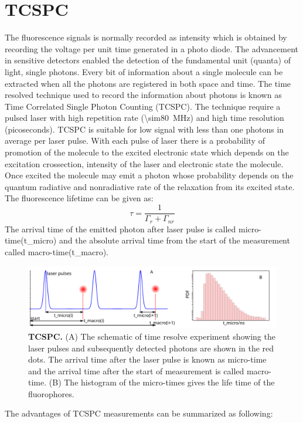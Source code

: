 \documentclass[11pt,a4paper,onecolumn]{article}
\begin{document}
\section{TCSPC}
The fluorescence signals is normally recorded as intensity which is obtained by recording the voltage per unit time generated in a photo diode.
The advancement in sensitive detectors enabled the detection of the fundamental unit (quanta) of light, single photons.
Every bit of information about a single molecule can be extracted when all the photons are registered in both space and time.
The time resolved technique used to record the information about photons is known as Time Correlated Single Photon Counting (TCSPC).
The technique require a pulsed laser with high repetition rate (\SI{\sim80}{\MHz}) and high time resolution (picoseconds).
TCSPC is suitable for low signal with less than one photons in average per laser pulse.
With each pulse of laser there is a probability of promotion of the molecule to the excited electronic state which depends on the excitation crossection, intensity of the laser and electronic state the molecule.
Once excited the molecule may emit a photon whose probability depends on the quantum radiative and nonradiative rate of the relaxation from its excited state.
The fluorescence lifetime can be given as:
\begin{equation}
	\tau = \frac{1}{\Gamma_{r} + \Gamma_{nr}}
\end{equation}
The arrival time of the emitted photon after laser pulse is called micro-time(t\_micro) and the absolute arrival time from the start of the measurement called macro-time(t\_macro).
\begin{figure}
	\centering
	\includegraphics[width=\textwidth]{tcspc_sch}
	\caption{\textbf{TCSPC.} (A) The schematic of time resolve experiment showing the laser pulses and subsequently detected photons are shown in the red dots.
	The arrival time after the laser pulse is known as micro-time and the arrival time after the start of measurement is called macro-time.
	(B) The histogram of the micro-times gives the life time of the fluorophores.}
	\label{fig:tcspc_sch}
\end{figure}
The advantages of TCSPC measurements can be summarized as following:
\end{document}
